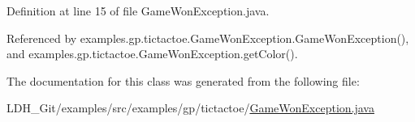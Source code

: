 Definition at line 15 of file Game\-Won\-Exception.\-java.



Referenced by examples.\-gp.\-tictactoe.\-Game\-Won\-Exception.\-Game\-Won\-Exception(), and examples.\-gp.\-tictactoe.\-Game\-Won\-Exception.\-get\-Color().



The documentation for this class was generated from the following file\-:\begin{DoxyCompactItemize}
\item 
L\-D\-H\-\_\-\-Git/examples/src/examples/gp/tictactoe/\hyperlink{_game_won_exception_8java}{Game\-Won\-Exception.\-java}\end{DoxyCompactItemize}
